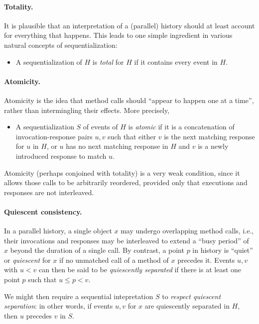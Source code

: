 \documentclass[
]{article}
\begin{document}
\paragraph{Totality.} 
It is plausible that an interpretation of a (parallel) history should at least account for everything that happens.  This leads to one simple ingredient in various natural concepts of sequentialization:
\begin{itemize}
\item[] A sequentialization of $H$ is \emph{total} for $H$ if it contains every event in $H$.  
\end{itemize}

\paragraph{Atomicity.} Atomicity is the idea that method calls should ``appear to happen one at a time'', rather than intermingling their effects.  More precisely,
\begin{itemize}
\item[] A sequentialization $S$ of events of $H$ is \emph{atomic} if it is a concatenation of invocation-response pairs $u, v$ such that either $v$ is the next matching response for $u$ in $H$, or $u$ has no next matching response in $H$ and $v$ is a newly introduced response to match $u$.
\end{itemize}
Atomicity (perhaps conjoined with totality) is a very weak condition, since it allows those calls to be arbitrarily reordered, provided only that executions and responses are not interleaved.

\paragraph{Quiescent consistency.}
In a parallel history, a single object $x$ may undergo overlapping method calls, i.e., their invocations and responses may be interleaved to extend a ``busy period'' of $x$ beyond the duration of a single call. By contrast, a point $p$ in history is ``quiet'' or \emph{quiescent} for $x$ if no unmatched call of a method of $x$ precedes it.  Events $u,v$ with $u<v$ can then be said to be \emph{quiescently separated} if there is at least one point $p$ such that $u\leq p<v$. 

We might then require a sequential intepretation $S$ to \emph{respect quiescent separation}: in other words, if events $u,v$ for $x$ are quiescently separated in $H$, then $u$ precedes $v$ in $S$.  
\end{document}
